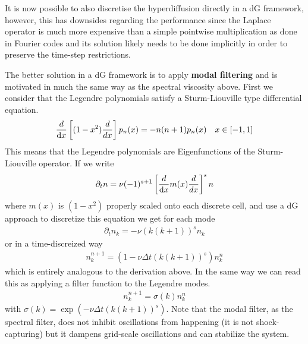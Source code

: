 It is now possible to also discretise the hyperdiffusion directly in a dG framework, however, this
has downsides regarding the performance since the Laplace operator is much more expensive than a
simple pointwise multiplication as done in Fourier codes and its solution likely needs to be done implicitly
in order to preserve the time-step restrictions.

The better solution in a dG framework is to apply \textbf{modal filtering} and is motivated in much the same
way as the spectral viscosity above.
First we consider that the Legendre polynomials satisfy a Sturm-Liouville type differential equation.
\begin{align}
    \frac{d}{\mathrm{d} x} \left[ (1-x^2) \frac{ d }{d x} \right]p_n(x) = -n(n+1) p_n(x) \quad x \in [-1,1]
\end{align}
This means that the Legendre polynomials are Eigenfunctions of the Sturm-Liouville operator. If we write
\begin{align}
    \partial_t n = \nu (-1)^{s+1}\left[\frac{d}{\mathrm{d} x}  m(x) \frac{ d }{d x} \right]^s  n
\end{align}
where $m(x)$ is $(1-x^2)$ properly scaled onto each discrete cell, and use a dG approach to discretize this equation we get for each mode
\begin{align}
    \partial_t n_k = -\nu (k(k+1))^s  n_k
\end{align}
or in a time-discreized way
\begin{align}
    n_k^{n+1} = (1-\nu \Delta t (k(k+1))^s ) n_k^n
\end{align}
which is entirely analogous to the derivation above.
In the same way we can read this as applying a filter function to the Legendre modes.
\begin{align}
    n_k^{n+1} = \sigma(k) n_k^n
\end{align}
with $\sigma(k) = \exp( - \nu \Delta t (k(k+1))^s)$.
Note that the modal filter, as the spectral filter, does not inhibit oscillations from happening (it is not shock-capturing) but it dampens grid-scale oscillations
and can stabilize the system.



